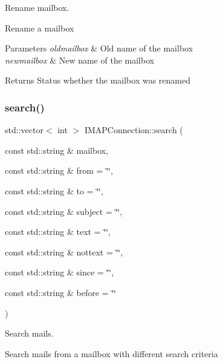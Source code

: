 Rename mailbox. 

Rename a mailbox


\begin{DoxyParams}{Parameters}
{\em oldmailbox} & Old name of the mailbox \\
\hline
{\em newmailbox} & New name of the mailbox\\
\hline
\end{DoxyParams}
\begin{DoxyReturn}{Returns}
Status whether the mailbox was renamed 
\end{DoxyReturn}
\mbox{\label{classIMAPConnection_aef0dd4280dd0f09eaedc69d5dbd54af5}} 
\subsubsection{\texorpdfstring{search()}{search()}}
{\footnotesize\ttfamily std\+::vector$<$ int $>$ I\+M\+A\+P\+Connection\+::search (\begin{DoxyParamCaption}\item[{const std\+::string \&}]{mailbox,  }\item[{const std\+::string \&}]{from = {\ttfamily \char`\"{}\char`\"{}},  }\item[{const std\+::string \&}]{to = {\ttfamily \char`\"{}\char`\"{}},  }\item[{const std\+::string \&}]{subject = {\ttfamily \char`\"{}\char`\"{}},  }\item[{const std\+::string \&}]{text = {\ttfamily \char`\"{}\char`\"{}},  }\item[{const std\+::string \&}]{nottext = {\ttfamily \char`\"{}\char`\"{}},  }\item[{const std\+::string \&}]{since = {\ttfamily \char`\"{}\char`\"{}},  }\item[{const std\+::string \&}]{before = {\ttfamily \char`\"{}\char`\"{}} }\end{DoxyParamCaption})}



Search mails. 

Search mails from a mailbox with different search criteria


